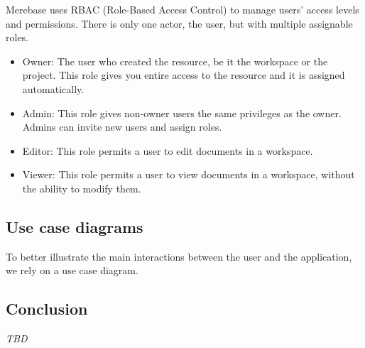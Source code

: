 \documentclass[
  12pt,
  a4paper,
]{article}
\providecommand{\tightlist}{%
  \setlength{\itemsep}{0pt}\setlength{\parskip}{0pt}}
\begin{document}
Merebase uses RBAC (Role-Based Access Control) to manage users' access
levels and permissions. There is only one actor, the user, but with
multiple assignable roles.

\begin{itemize}
\tightlist
\item
  Owner: The user who created the resource, be it the workspace or the
  project. This role gives you entire access to the resource and it is
  assigned automatically.
\item
  Admin: This role gives non-owner users the same privileges as the
  owner. Admins can invite new users and assign roles.
\item
  Editor: This role permits a user to edit documents in a workspace.
\item
  Viewer: This role permits a user to view documents in a workspace,
  without the ability to modify them.
\end{itemize}

\hypertarget{use-case-diagrams}{%
\subsection{Use case diagrams}\label{use-case-diagrams}}

To better illustrate the main interactions between the user and the
application, we rely on a use case diagram.



\hypertarget{conclusion-1}{%
\subsection{Conclusion}\label{conclusion-1}}

\emph{TBD}
\end{document}
